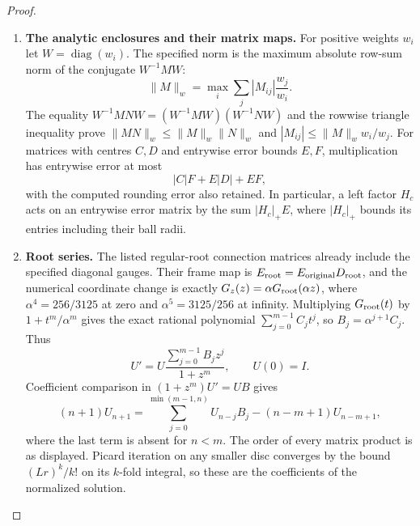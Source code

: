 \begin{proof}
\begin{enumerate}[label={$\langle1\rangle$\arabic*.}]
\begin{enumerate}[label={$\langle2\rangle$\arabic*.},leftmargin=*]
\item \textbf{The analytic enclosures and their matrix maps.}
For positive weights $w_i$ let $W=\operatorname{diag}(w_i)$. The
specified norm is the maximum absolute row-sum norm of the conjugate $W^{-1}MW$:
\[
 \|M\|_w=\max_i\sum_j|M_{ij}|\frac{w_j}{w_i}.
\]
The equality $W^{-1}MNW=(W^{-1}MW)(W^{-1}NW)$ and the rowwise
triangle inequality prove
$\|MN\|_w\le\|M\|_w\|N\|_w$ and
$|M_{ij}|\le\|M\|_w w_i/w_j$. For matrices with centres $C,D$
and entrywise error bounds $E,F$, multiplication has entrywise
error at most
\[
 |C|F+E|D|+EF,
\]
with the computed rounding error also retained. In particular, a
left factor $H_c$ acts on an entrywise error matrix by the sum $|H_c|_+E$, where $|H_c|_+$ bounds its entries including their
ball radii.

\item \textbf{Root series.}
The listed regular-root connection matrices already include the
specified diagonal gauges. Their frame map is
$E_{\rm root}=E_{\rm original}D_{\rm root}$, and the numerical
coordinate change is exactly
$G_z(z)=\alpha G_{\rm root}(\alpha z)$, where
$\alpha^4=256/3125$ at zero and $\alpha^5=3125/256$ at infinity.
Multiplying $G_{\rm root}(t)$ by $1+t^m/\alpha^m$ gives the exact
rational polynomial $\sum_{j=0}^{m-1}C_jt^j$, so
$B_j=\alpha^{j+1}C_j$. Thus
\[
 U'=U\frac{\sum_{j=0}^{m-1}B_jz^j}{1+z^m},\qquad U(0)=I.\tag{1.18.2}
\]
Coefficient comparison in $(1+z^m)U'=UB$ gives
\[
 (n+1)U_{n+1}
 =\sum_{j=0}^{\min(m-1,n)}U_{n-j}B_j
   -(n-m+1)U_{n-m+1},
\]
where the last term is absent for $n<m$. The order of every
matrix product is as displayed. Picard iteration on any smaller
disc converges by the bound $(Lr)^k/k!$ on its $k$-fold integral,
so these are the coefficients of the normalized solution.


\end{enumerate}
\end{enumerate}
\end{proof}
